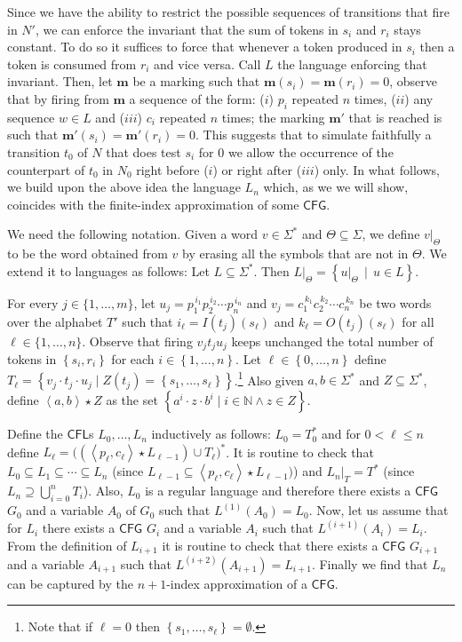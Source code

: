 \documentclass{fsttcs}
\def\set#1{{\left\{ #1 \right\}}}
\def\tuple#1{{\left\langle #1 \right\rangle}}
\def\nats{{\mathbb{N}}}
\def\mmap{\mathbf{m}}
\def\cfl{\mathsf{CFL}}
\def\cfg{\mathsf{CFG}}
\begin{document}
{
Since we have the ability to restrict the possible sequences of transitions
that fire in \(N'\), we can enforce the invariant that the sum of tokens in
\(s_i\) and \(r_i\) stays constant.  To do so it suffices to force that
whenever a token produced in \(s_i\) then a token is consumed from \(r_i\) and
vice versa. Call \(L\) the language enforcing that invariant. Then, let
\(\mmap\) be a marking such that \(\mmap(s_i)=\mmap(r_i)=0\), observe that by
firing from \(\mmap\) a sequence of the form: (\(i\)) \(p_i\) repeated \(n\) times, (\(ii\))
any sequence \(w\in L\) and (\(iii\)) \(c_i\) repeated \(n\) times; the marking
\(\mmap'\) that is reached is such that \(\mmap'(s_i)=\mmap'(r_i)=0\). This
suggests that to simulate faithfully a transition \(t_0\) of \(N\) that does
test \(s_i\) for \(0\) we allow the occurrence of the counterpart of \(t_0\) in
\(N_0\) right before (\(i\)) or right after (\(iii\)) only. In what follows, we build
upon the above idea the language \(L_n\) which, as we we will show, coincides
with the finite-index approximation of some \(\cfg\).
}

We need the following notation. Given  a word $v \in \Sigma^*$ and \(\Theta\subseteq
\Sigma\), we define $v|_{\Theta}$ to be the word obtained from $v$ by erasing
all the symbols that are not in $\Theta$. We extend it to languages as follows:
Let \(L\subseteq\Sigma^*\). Then $L|_{\Theta}=\set{u|_{\Theta}\,\mid \, u \in
L}$.

\smallskip {} For every $j  \in \{1,\ldots,m\}$,
let ${u}_j= p^{\, i_1}_1 p^{\, i_2}_2 \cdots p^{\, i_n}_n$ and  $v_j= c^{\,
k_1}_1 c^{\, k_2}_2 \cdots c^{\, k_n}_n$  be two words over  the alphabet $T'$
such that $i_\ell=I(t_j)(s_\ell)$ and $k_\ell=O(t_j)(s_\ell)$ for all $\ell \in
\{1,\ldots,n\}$.   Observe that  firing $v_j
t_j u_j$ keeps unchanged the total number of tokens in \(\set{s_i,r_i}\) for
each \(i\in\set{1,\ldots,n}\). Let
\(\ell\in\set{0,\ldots,n}\) define \(T_{\ell}=\set{ v_j\cdot t_j\cdot u_j \mid
Z(t_j)=\set{s_1,\ldots,s_{\ell}}}\).\footnote{Note that if \(\ell=0\) then
\(\set{s_1,\ldots,s_{\ell}}=\emptyset\).} Also given \(a,b\in\Sigma^*\) and
\(Z\subseteq \Sigma^*\), define \( \tuple{a,b}\star Z\) as the set \(\set{ a^i \cdot
z \cdot b^i \mid i\in\nats\land z\in Z}\).

Define the \(\cfl\)s \(L_0,\ldots,L_n\) inductively as follows: \(L_0=T_{0}^*\)
and for \(0<\ell\leq n\) define \(L_\ell= \bigl((\tuple{p_{\ell},c_{\ell}}\star
L_{\ell-1}) \cup T_{\ell}\bigr)^*\).  It is routine to check that $L_0
\subseteq L_1 \subseteq \cdots \subseteq L_n$ (since $L_{\ell-1}\subseteq
\tuple{p_{\ell},c_{\ell}}\star L_{\ell-1})$) and $L_n|_{T}=T^*$ (since
\(L_n\supseteq \bigcup_{i=0}^n T_i\)). 
{Also, \(L_0\) is a regular
language and therefore there exists a \(\cfg\) \(G_0\) and a variable \(A_0\)
of \(G_0\) such that \(L^{(1)}(A_0)=L_0\).  Now, let us assume that for \(L_i\)
there exists a \(\cfg\) \(G_i\) and a variable \(A_i\) such that
\(L^{(i+1)}(A_i)=L_i\).  From the definition of \(L_{i+1}\) it is routine to
check that there exists a \(\cfg\) \(G_{i+1}\) and a variable \(A_{i+1}\) such
that \(L^{(i+2)}(A_{i+1})=L_{i+1}\). Finally we find that \(L_{n}\) can be
captured by the \(n+1\)-index approximation of a \(\cfg\).
}
\end{document}
